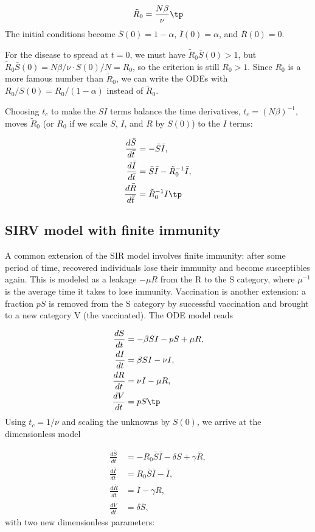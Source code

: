 \documentclass[graybox,envcountchap,sectrefs,final]{svmonodo}
\begin{document}
\begin{equation}
\tilde R_0 = \frac{N\beta}{\nu}\tp
\end{equation}
The initial conditions become $\bar S(0)=1-\alpha$, $\bar I(0)=\alpha$,
and $\bar R(0)=0$.

For the disease to spread at $t=0$, we must have $\tilde R_0 \bar S(0) > 1$,
but $\tilde R_0 \bar S(0) = N\beta/\nu \cdot S(0)/N = R_0$, so the
criterion is still $R_0 > 1$. Since $R_0$ is a more famous number than
$\tilde R_0$, we can write the ODEs with $R_0/S(0) = R_0/(1-\alpha)$
instead of $\tilde R_0$.

Choosing $t_c$ to make the $SI$ terms balance the time derivatives,
$t_c = (N\beta)^{-1}$, moves $\tilde R_0$ (or $R_0$ if we scale
$S$, $I$, and $R$ by $S(0)$) to the $I$ terms:

\begin{align*}
\frac{d\bar S}{d\bar t} &= - \bar S\bar I,
\\ 
\frac{d\bar I}{d\bar t} &= \bar S\bar I - \tilde R_0^{-1} \bar I,
\\ 
\frac{d\bar R}{d\bar t} &= \tilde R_0^{-1} I\tp
\end{align*}

\subsection{SIRV model with finite immunity}

A common extension of the SIR model involves finite immunity: after
some period of time, recovered individuals lose their immunity
and become susceptibles again. This is modeled as
a leakage $-\mu R$ from the R to the S category, where $\mu^{-1}$
is the average time it takes to lose immunity.
Vaccination is another extension: a fraction $pS$ is removed from the
S category by successful vaccination and brought to a new category V (the
vaccinated). The ODE model reads

\begin{align}
\frac{dS}{dt} &= - \beta SI - pS + \mu R,
\label{scale:SIRV:S}\\ 
\frac{dI}{dt} &= \beta SI - \nu I,
\label{scale:SIRV:I}\\ 
\frac{dR}{dt} &= \nu I -\mu R,
\label{scale:SIRV:R}\\ 
\frac{dV}{dt} &= p S\tp
\label{scale:SIRV:V}
\end{align}
Using $t_c=1/\nu$ and scaling the unknowns by $S(0)$, we arrive at
the dimensionless model

\begin{align}
\frac{d\bar S}{d\bar t} &= - R_0 \bar S \bar I - \delta S + \gamma \bar R,
\label{scale:SIRV:S2}\\ 
\frac{d\bar I}{d\bar t} &= R_0 \bar S \bar I - \bar I,
\label{scale:SIRV:I2}\\ 
\frac{d\bar R}{d\bar t} &= \bar I -\gamma \bar R,
\label{scale:SIRV:R2}\\ 
\frac{d\bar V}{d\bar t} &= \delta \bar S,
\label{scale:SIRV:V2}
\end{align}
with two new dimensionless parameters:
\end{document}
